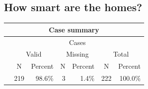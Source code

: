 \subsection{How smart are the homes?}

\begin{table}[H]
\begin{tabular}{|l|c|c|c|c|c|c|}
\hline
\multicolumn{7}{|c|}{{\color[HTML]{010205} \textbf{Case summary}}}                                                                                                                                                                                                                                                                                                              \\ \hline
{\color[HTML]{264A60} }                                      & \multicolumn{6}{c|}{{\color[HTML]{264A60} Cases}}                                                                                                                                                                                                                                                                \\ \cline{2-7} 
{\color[HTML]{264A60} }                                      & \multicolumn{2}{c|}{{\color[HTML]{264A60} Valid}}                                                    & \multicolumn{2}{c|}{{\color[HTML]{264A60} Missing}}                                               & \multicolumn{2}{c|}{{\color[HTML]{264A60} Total}}                                                     \\ \cline{2-7} 
\multirow{-3}{*}{{\color[HTML]{264A60} }}                    & {\color[HTML]{264A60} N}                        & {\color[HTML]{264A60} Percent}                     & {\color[HTML]{264A60} N}                      & {\color[HTML]{264A60} Percent}                    & {\color[HTML]{264A60} N}                        & {\color[HTML]{264A60} Percent}                      \\ \hline
\cellcolor[HTML]{E0E0E0}{\color[HTML]{000000} Smart devices} & \multicolumn{1}{r|}{{\color[HTML]{010205} 219}} & \multicolumn{1}{r|}{{\color[HTML]{010205} 98.6\%}} & \multicolumn{1}{r|}{{\color[HTML]{010205} 3}} & \multicolumn{1}{r|}{{\color[HTML]{010205} 1.4\%}} & \multicolumn{1}{r|}{{\color[HTML]{010205} 222}} & \multicolumn{1}{r|}{{\color[HTML]{010205} 100.0\%}} \\ \hline
\end{tabular}
\end{table}

